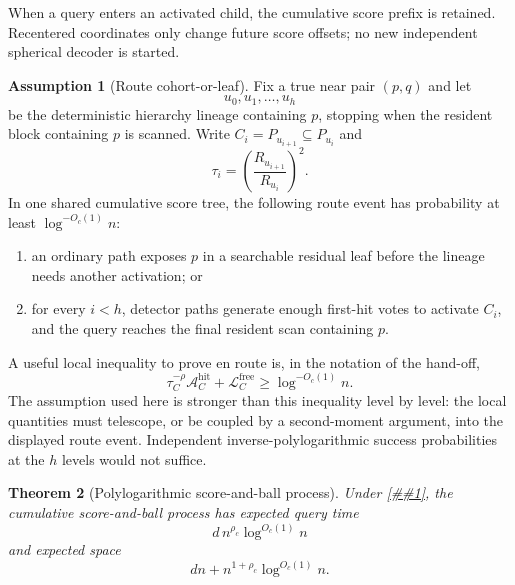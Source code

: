 \documentclass[10pt]{article}
\newcommand{\cref}[1]{\ref{##1}}
\newtheorem{theorem}{Theorem}[section]
\theoremstyle{definition}
\newtheorem{assumption}[theorem]{Assumption}
\begin{document}
When a query enters an activated child, the cumulative score prefix is retained. Recentered coordinates only change future score offsets; no new independent spherical decoder is started.

\begin{assumption}[Route cohort-or-leaf]\label{asm:cohort-or-leaf}
   Fix a true near pair $(p,q)$ and let
   \[
      u_0,u_1,\ldots,u_h
   \]
   be the deterministic hierarchy lineage containing $p$, stopping when the resident block containing $p$ is scanned. Write $C_i=P_{u_{i+1}}\subseteq P_{u_i}$ and
   \[
      \tau_i=\left(\frac{R_{u_{i+1}}}{R_{u_i}}\right)^2.
   \]
   In one shared cumulative score tree, the following route event has probability at least $\log^{-O_c(1)}n$:
   \begin{enumerate}
      \item an ordinary path exposes $p$ in a searchable residual leaf before the lineage needs another activation; or
      \item for every $i<h$, detector paths generate enough first-hit votes to activate $C_i$, and the query reaches the final resident scan containing $p$.
   \end{enumerate}
   A useful local inequality to prove en route is, in the notation of the hand-off,
   \[
      \tau_C^{-\rho}\mathcal A_C^{\mathrm{hit}}
      +
      \mathcal L_C^{\mathrm{free}}
      \ge
      \log^{-O_c(1)}n.
   \]
   The assumption used here is stronger than this inequality level by level: the local quantities must telescope, or be coupled by a second-moment argument, into the displayed route event. Independent inverse-polylogarithmic success probabilities at the $h$ levels would not suffice.
\end{assumption}

\begin{theorem}[Polylogarithmic score-and-ball process]\label{thm:polylog-process}
   Under \cref{asm:cohort-or-leaf}, the cumulative score-and-ball process has expected query time
   \[
      d\,n^{\rho_c}\log^{O_c(1)}n
   \]
   and expected space
   \[
      dn+n^{1+\rho_c}\log^{O_c(1)}n.
   \]
\end{theorem}
\end{document}
